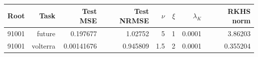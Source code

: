 \begin{tabular}{rrrrrrrr}
Root & Task & Test MSE & Test NRMSE & $\nu$ & $\xi$ & $\lambda_K$ & RKHS norm \\
\hline
91001 & future & 0.197677 & 1.02752 & 5 & 1 & 0.0001 & 3.86203 \\
91001 & volterra & 0.00141676 & 0.945809 & 1.5 & 2 & 0.0001 & 0.355204 \\
\end{tabular}
